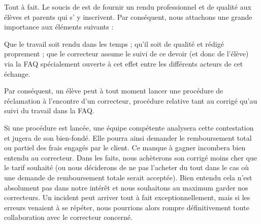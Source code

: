 ﻿Tout à fait. Le soucis de \eDevoir est de fournir un rendu professionnel et de qualité aux élèves et parents qui s' y inscrivent. Par conséquent, nous attachons une grande importance aux éléments suivants :
\begin{itemize}
	\li Que le travail soit rendu dans les temps ;
	\li qu'il soit de qualité et rédigé proprement ;
	\li que le correcteur assume le suivi de ce devoir (et donc de l'élève) via la FAQ spécialement ouverte à cet effet entre les différents acteurs de cet échange.
\end{itemize}

Par conséquent, un élève peut à tout moment lancer une procédure de réclamation à l'encontre d'un correcteur, procédure relative tant au corrigé qu'au suivi du travail dans la FAQ.

Si une procédure est lancée, une équipe compétente analysera cette contestation et jugera de son bien-fondé. Elle pourra ainsi demander le remboursement total ou partiel des frais engagés par le client. Ce manque à gagner incombera bien entendu au correcteur. Dans les faits, nous achèterons son corrigé moins cher que le tarif souhaité (ou nous déciderons de ne pas l'acheter du tout dans le cas où une demande de remboursement totale serait acceptée). Bien entendu cela n'est absolument pas dans notre intérêt et nous souhaitons au maximum garder nos correcteurs. Un incident peut arriver tout à fait exceptionnellement, mais si les erreurs venaient à se répéter, nous pourrions alors rompre définitivement toute collaboration avec le correcteur concerné.